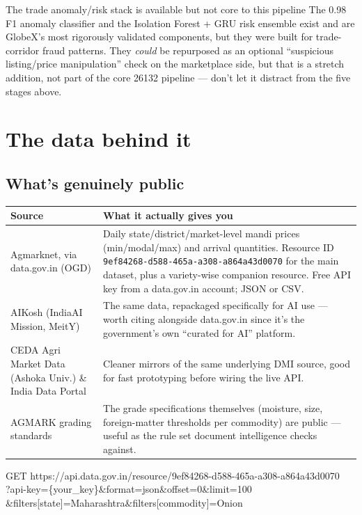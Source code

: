 \documentclass[11pt]{article}
\begin{document}
\begin{warnbox}{The trade anomaly/risk stack is available but not core to this pipeline}
The 0.98 F1 anomaly classifier and the Isolation Forest + GRU risk ensemble exist and are GlobeX's most
rigorously validated components, but they were built for trade-corridor fraud patterns. They \emph{could}
be repurposed as an optional ``suspicious listing/price manipulation'' check on the marketplace side, but
that is a stretch addition, not part of the core 26132 pipeline --- don't let it distract from the five
stages above.
\end{warnbox}

\clearpage
\section{The data behind it}

\subsection*{What's genuinely public}
\renewcommand{\arraystretch}{1.3}
\noindent\begin{longtable}{@{}p{4.3cm}p{8.5cm}@{}}
\toprule
\textbf{Source} & \textbf{What it actually gives you} \\
\midrule
\endhead
Agmarknet, via data.gov.in (OGD) & Daily state/district/market-level mandi prices (min/modal/max) and
arrival quantities. Resource ID \texttt{9ef84268-d588-465a-a308-a864a43d0070} for the main dataset, plus a
variety-wise companion resource. Free API key from a data.gov.in account; JSON or CSV. \\[0.3em]
AIKosh (IndiaAI Mission, MeitY) & The same data, repackaged specifically for AI use --- worth citing
alongside data.gov.in since it's the government's own ``curated for AI'' platform. \\[0.3em]
CEDA Agri Market Data (Ashoka Univ.) \& India Data Portal & Cleaner mirrors of the same underlying DMI
source, good for fast prototyping before wiring the live API. \\[0.3em]
AGMARK grading standards & The grade specifications themselves (moisture, size, foreign-matter thresholds
per commodity) are public --- useful as the rule set document intelligence checks against. \\
\bottomrule
\end{longtable}

\begin{codebox}
GET https://api.data.gov.in/resource/9ef84268-d588-465a-a308-a864a43d0070\\
    ?api-key=\{your\_key\}\&format=json\&offset=0\&limit=100\\
    \&filters[state]=Maharashtra\&filters[commodity]=Onion
\end{codebox}
\end{document}
